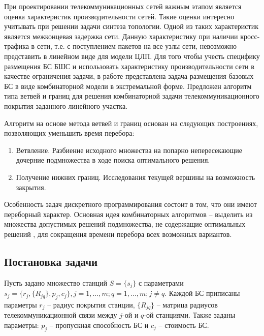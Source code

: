 При проектировании телекоммуникационных сетей важным этапом является оценка характеристик производительности сетей. Такие оценки интересно учитывать при решении задачи синтеза топологии. Одной из таких характеристик является межконцевая задержка сети. Данную характеристику при наличии кросс-трафика в сети, т.е. с поступлением пакетов на все узлы сети, невозможно представить в линейном виде для модели ЦЛП. Для того чтобы учесть специфику размещения БС БШС и использовать характеристику производительности сети в качестве ограничения задачи, в работе  представлена задача размещения базовых БС в виде комбинаторной модели в экстремальной форме. Предложен алгоритм типа ветвей и границ для решения комбинаторной задачи телекоммуникационного покрытия заданного линейного участка.

Алгоритм на основе метода ветвей и границ основан на следующих построениях, позволяющих уменьшить время перебора:

\begin{enumerate}
  \item Ветвление. Разбиение исходного множества на попарно непересекающие дочерние подмножества в ходе поиска оптимального решения.
  \item Получение нижних границ. Исследования текущей вершины на возможность закрытия.
\end{enumerate}

Особенность задач дискретного программирования состоит в том, что они имеют переборный характер. Основная идея комбинаторных алгоритмов -- выделить из множества допустимых решений подмножества, не содержащие оптимальных решений \cite{SigalBook}, для сокращения времени перебора всех возможных вариантов. 




\subsection{Постановка задачи}

Пусть задано множество станций $S=\{s_j\}$ с параметрами $s_j=\{r_j,\{R_{jq} \},p_j, c_j \},j=1,...,m;q=1,...,m;j \neq q $. Каждой БС приписаны параметры $r_j$ -- радиус покрытия станции, $\{R_{jq} \}$ -- матрица радиусов телекоммуникационной  связи между $j$-ой и $q$-ой станциями. Также заданы параметры: $p_j$ -- пропускная способность БС и $c_j$ -- стоимость БС.


